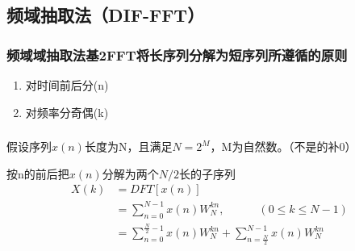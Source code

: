 \documentclass[notheorems,compress,mathserif,table]{beamer}
\begin{document}
\subsection{频域抽取法（DIF-FFT）}
\begin{frame}[shrink]\frametitle{频域域抽取法基2FFT将长序列分解为短序列所遵循的原则}%
\begin{enumerate}
  \item 对时间前后分(n)
  \item 对频率分奇偶(k)
\end{enumerate}
\end{frame}
\begin{frame}\frametitle{}%

\par 假设序列$x(n)$长度为N，且满足$N=2^{M}$，M为自然数。（不是的补0）
\par 按n的前后把$x(n)$分解为两个$N/2$长的子序列
    \begin{equation*} \label{eq:4}
    \begin{split}
    X(k)&= DFT[x(n)] \\
        &= \sum_{n=0}^{N-1}x(n)W_{N}^{kn},\quad\quad\quad (0\leq k\leq N-1)\\
        &= \sum_{n=0}^{\frac{N}{2}-1}x(n)W_{N}^{kn} +\sum_{n=\frac{N}{2}}^{N-1}x(n)W_{N}^{kn}\\
    \end{split}
    \end{equation*}
\end{frame}
\end{document}
